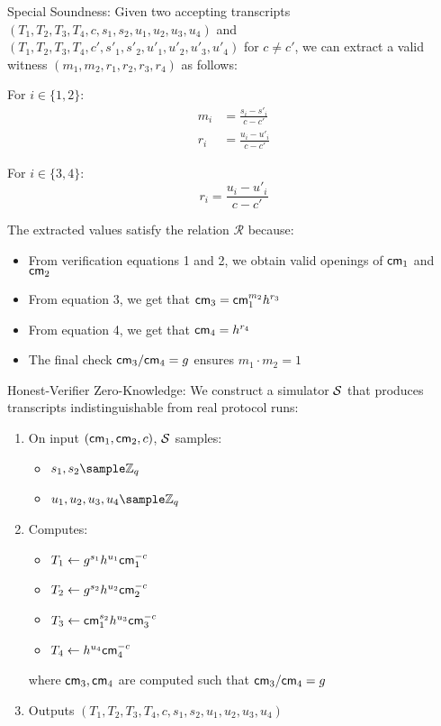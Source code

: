 \noindent Special Soundness: Given two accepting transcripts $(T_1,T_2,T_3,T_4,c,s_1,s_2,u_1,u_2,u_3,u_4)$ and $(T_1,T_2,T_3,T_4,c',s'_1,s'_2,u'_1,u'_2,u'_3,u'_4)$ for $c \neq c'$, we can extract a valid witness $(m_1,m_2,r_1,r_2,r_3,r_4)$ as follows:

For $i \in \{1,2\}$:
\begin{align*}
m_i &= \frac{s_i - s'_i}{c - c'} \\
r_i &= \frac{u_i - u'_i}{c - c'} 
\end{align*}

For $i \in \{3,4\}$:
\[
r_i = \frac{u_i - u'_i}{c - c'}
\]

\noindent The extracted values satisfy the relation $\mathcal{R}$ because:
\begin{itemize}
    \item From verification equations 1 and 2, we obtain valid openings of $\mathsf{cm}_1$ and $\mathsf{cm}_2$
    \item From equation 3, we get that $\mathsf{cm}_3 = \mathsf{cm}_1^{m_2}h^{r_3}$
    \item From equation 4, we get that $\mathsf{cm}_4 = h^{r_4}$
    \item The final check $\mathsf{cm}_3/\mathsf{cm}_4 = g$ ensures $m_1 \cdot m_2 = 1$
\end{itemize}

\noindent Honest-Verifier Zero-Knowledge: We construct a simulator $\mathcal{S}$ that produces transcripts indistinguishable from real protocol runs:

\begin{enumerate}
    \item On input $(\mathsf{cm}_1,\mathsf{cm}_2,c)$, $\mathcal{S}$ samples:
        \begin{itemize}
            \item $s_1,s_2 \sample \Z_q$
            \item $u_1,u_2,u_3,u_4 \sample \Z_q$
        \end{itemize}
    
    \item Computes:
        \begin{itemize}
            \item $T_1 \gets g^{s_1}h^{u_1}\mathsf{cm}_1^{-c}$
            \item $T_2 \gets g^{s_2}h^{u_2}\mathsf{cm}_2^{-c}$
            \item $T_3 \gets \mathsf{cm}_1^{s_2}h^{u_3}\mathsf{cm}_3^{-c}$
            \item $T_4 \gets h^{u_4}\mathsf{cm}_4^{-c}$
        \end{itemize}
        where $\mathsf{cm}_3,\mathsf{cm}_4$ are computed such that $\mathsf{cm}_3/\mathsf{cm}_4 = g$
    
    \item Outputs $(T_1,T_2,T_3,T_4,c,s_1,s_2,u_1,u_2,u_3,u_4)$
\end{enumerate}

